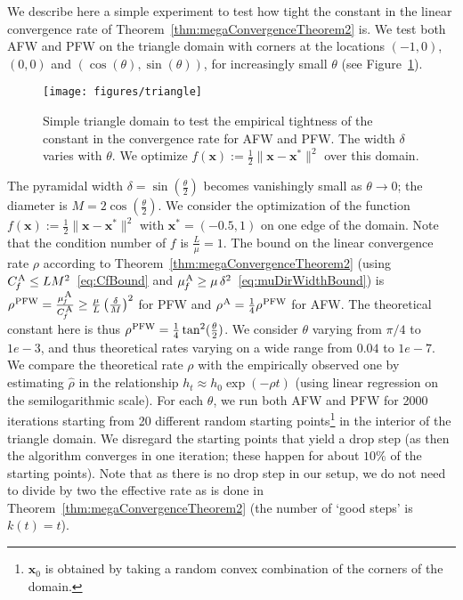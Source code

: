 \documentclass{article} %
\newcommand{\PFW}{{\hspace{0.05em}\textnormal{PFW}}}
\newcommand{\away}{{\hspace{0.06em}\textnormal{\scriptsize A}}}
\newcommand{\CfAFW}{C_{\hspace{-0.08em}f}^\away}
\newcommand{\strongConvAFW}{\mu_{\hspace{-0.08em}f}^\away}
\newcommand{\x}{\bm{x}}
\newcommand{\0}{\mathbf{0}} %
\begin{document}
We describe here a simple experiment to test how tight the 
constant in the linear convergence rate of Theorem~\ref{thm:megaConvergenceTheorem2}
is. We test both AFW and PFW on the triangle domain
with corners at the locations
$(-1,0)$, $(0,0)$ and $(\cos(\theta),\sin(\theta))$, for
increasingly small $\theta$ (see Figure~\ref{fig:triangle}).

\begin{figure}[t]
\begin{center}
%
\texttt{[image: figures/triangle]}
\end{center}
\caption{Simple triangle domain to test the empirical
tightness of the constant in the convergence rate for AFW and PFW.
The width $\delta$ varies with $\theta$. We optimize $f(\x) := \frac{1}{2} \|\x-\x^*\|^2$
over this domain.} \label{fig:triangle}
\end{figure}

The pyramidal width $\delta=\sin(\frac{\theta}{2})$
becomes vanishingly small as $\theta \to 0$; the
diameter is $M=2\cos(\frac{\theta}{2})$.
We consider the optimization of the 
function $f(\x) := \frac{1}{2} \|\x-\x^*\|^2$
with $\x^*=(-0.5,1)$ on one edge of the domain.
Note that the condition number of $f$ is $\frac{L}{\mu}=1$.
The bound on the linear convergence rate $\rho$ according
to Theorem~\ref{thm:megaConvergenceTheorem2} 
(using $\CfAFW \leq L M^2$~\eqref{eq:CfBound} and $\strongConvAFW \geq \mu\, \delta^2$~\eqref{eq:muDirWidthBound})
is $\rho^\PFW = \frac{\strongConvAFW}{\CfAFW} \geq \frac{\mu}{L}\left(\frac{\delta}{M}\right)^2$
for PFW and $\rho^\away = \frac{1}{4} \rho^\PFW $ for AFW.
The theoretical constant here is thus $\rho^\PFW = \frac{1}{4} \tan^2 (\frac{\theta}{2})$.
We consider $\theta$ varying from $\pi/4$ to $1e\!-\!3$, and thus theoretical rates
varying on a wide range from $0.04$ to $1e\!-\!7$. We compare the theoretical rate $\rho$
with the empirically observed one by estimating $\hat{\rho}$ in the relationship
$h_t \approx h_0 \exp(-\rho t)$ (using linear regression on the semilogarithmic scale).
For each $\theta$, we run both AFW and PFW for 2000 iterations 
starting from 20 different random starting points\footnote{$\x_0$ is obtained by taking
a random convex combination of the corners of the domain.} 
in the interior of the triangle domain. We disregard the starting points
that yield a drop step (as then the algorithm converges in one iteration;
these happen for about $10\%$ of the starting points). Note
that as there is no drop step in our setup, we do not
need to divide by two the effective rate as is done in 
Theorem~\ref{thm:megaConvergenceTheorem2} (the number of `good steps' is $k(t) = t$).
\end{document}
